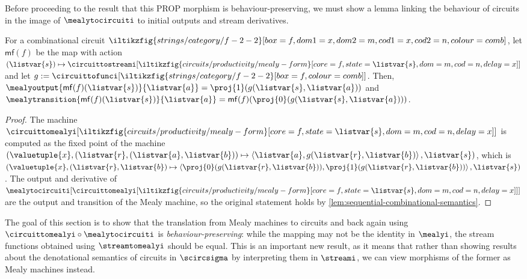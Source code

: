 \documentclass{lmcs}
\begin{document}
Before proceeding to the result that this PROP morphism is behaviour-preserving,
we must show a lemma linking the behaviour of circuits in the image of
\(\mealytocircuiti\) to initial outputs and stream derivatives.

\begin{prop}
    \label{prop:mealy-form-image}
    For a combinational circuit \(
    \iltikzfig{strings/category/f-2-2}[box=f,dom1=x,dom2=m,cod1=x,cod2=n,colour=comb]
    \), let \(\mathsf{mf}(f)\) be the map with action \(
    (\listvar{s}) \mapsto
    \circuittostreami[
        \iltikzfig{circuits/productivity/mealy-form}[core=f,state=\listvar{s},dom=m,cod=n,delay=x]
    ]
    \) and let \(
    g
    :=
    \circuittofunci[
        \iltikzfig{strings/category/f-2-2}[box=f,colour=comb]
    ]
    \).
    Then, \(
    \mealyoutput{\mathsf{mf}(f)(\listvar{s})}{\listvar{a}}
    =
    \proj{1}(g(\listvar{s}, \listvar{a}))
    \) and \(
    \mealytransition{\mathsf{mf}(f)(\listvar{s})}{\listvar{a}}
    =
    \mathsf{mf}(f)(\proj{0}(g(\listvar{s}, \listvar{a})))
    \).
\end{prop}
\begin{proof}
    The machine \(\circuittomealyi[
        \iltikzfig{circuits/productivity/mealy-form}[core=f,state=\listvar{s},dom=m,cod=n,delay=x]
    ]\) is computed as the fixed point of the machine \(
    \left(
    \valuetuple{x},
    (\listvar{r}, (\listvar{a}, \listvar{b}))
    \mapsto
    \left\langle
    \listvar{a}, g(\listvar{r}, \listvar{b})
    \right\rangle,
    \listvar{s}
    \right)
    \),
    which is
    \(
    \left(
    \valuetuple{x},
    \left(\listvar{r}, \listvar{b}\right)
    \mapsto
    \left\langle
    \proj{0}\mleft(g(\listvar{r}, \listvar{b})\mright),
    \proj{1}\mleft(g(\listvar{r}, \listvar{b})\mright)
    \right\rangle, \listvar{s}
    \right)
    \).
    The output and derivative of \(
    \mealytocircuiti[
        \circuittomealyi[
            \iltikzfig{circuits/productivity/mealy-form}[core=f,state=\listvar{s},dom=m,cod=n,delay=x]
        ]
    ]
    \) are the output and transition of the Mealy machine, so the original
    statement holds by \autoref{lem:sequential-combinational-semantics}.
\end{proof}

The goal of this section is to show that the translation from Mealy machines to
circuits and back again using \(\circuittomealyi \circ \mealytocircuiti\) is
\emph{behaviour-preserving}: while the mapping may not be the identity in
\(\mealyi\), the stream functions obtained using \(\streamtomealyi\) should
be equal.
This is an important new result, as it means that rather than showing
results about the denotational semantics of circuits in \(\scircsigma\) by
interpreting them in \(\streami\), we can view morphisms of the former as
Mealy machines instead.
\end{document}
